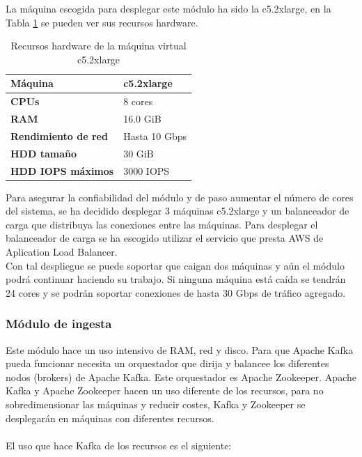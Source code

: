 La máquina escogida para desplegar este módulo ha sido la c5.2xlarge, en la Tabla \ref{tabla:c5.2xlarge} se pueden ver sus recursos hardware.


\begin{table}[H]\label{tabla:c5.2xlarge}
	\centering
	\begin{tabular}{|l|l|}
		\hline
		\textbf{Máquina}            & \textbf{c5.2xlarge}    \\ \hline
		\textbf{CPUs}               & 8 cores                \\ \hline
		\textbf{RAM}                & 16.0 GiB               \\ \hline
		\textbf{Rendimiento de red} & Hasta 10 Gbps          \\ \hline
		\textbf{HDD tamaño}         & 30 GiB                 \\ \hline
		\textbf{HDD IOPS máximos}   & 3000 IOPS              \\ \hline
	\end{tabular}
	\caption{Recursos hardware de la máquina virtual c5.2xlarge}
\end{table}



Para asegurar la confiabilidad del módulo y de paso aumentar el número de cores del sistema, se ha decidido desplegar 3 máquinas c5.2xlarge y un balanceador de carga que distribuya las conexiones entre las máquinas. Para desplegar el balanceador de carga se ha escogido utilizar el servicio que presta AWS de Aplication Load Balancer\cite{Tfg:apploadbalancer}.
\\
Con tal despliegue se puede soportar que caigan dos máquinas y aún el módulo podrá continuar haciendo su trabajo. Si ninguna máquina está caída se tendrán 24 cores y se podrán soportar conexiones de hasta 30 Gbps de tráfico agregado.


\subsubsection{Módulo de ingesta}
Este módulo hace un uso intensivo de RAM, red y disco. Para que Apache Kafka pueda funcionar necesita un orquestador que dirija y balancee los diferentes nodos (brokers) de Apache Kafka. Este orquestador es Apache Zookeeper. Apache Kafka y Apache Zookeeper hacen un uso diferente de los recursos, para no sobredimensionar las máquinas y reducir costes, Kafka y Zookeeper se desplegarán en máquinas con diferentes recursos.
\\\\
El uso que hace Kafka de los recursos es el siguiente\cite{Tfg:kafkadeploy}:


